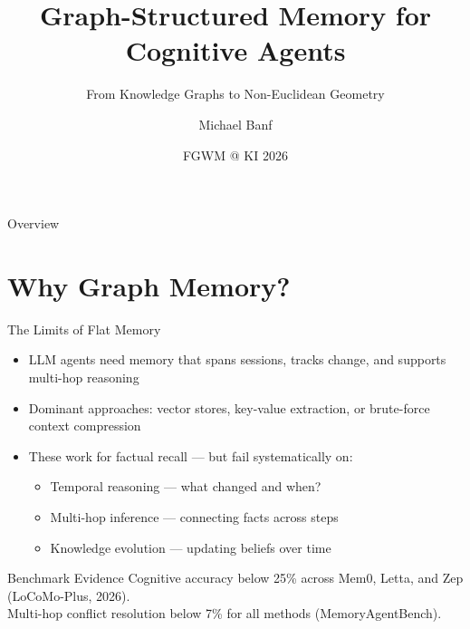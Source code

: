 \documentclass[aspectratio=169]{beamer}
\title{Graph-Structured Memory for Cognitive Agents}
\subtitle{From Knowledge Graphs to Non-Euclidean Geometry}
\author{Michael Banf}
\institute{Perelyn GmbH, Munich}
\date{FGWM @ KI 2026}
\begin{document}
\begin{frame}[plain]
  \titlepage
\end{frame}

\begin{frame}{Overview}
  \tableofcontents
\end{frame}

\section{Why Graph Memory?}

\begin{frame}[plain]
  \sectionpage
\end{frame}

\begin{frame}{The Limits of Flat Memory}
  \begin{itemize}
    \item LLM agents need memory that \alert{spans sessions}, tracks change,
      and supports multi-hop reasoning
    \item Dominant approaches: vector stores, key-value extraction, or
      brute-force context compression
    \item These work for factual recall --- but fail systematically on:
    \begin{itemize}
      \item \alert{Temporal reasoning} --- what changed and when?
      \item \alert{Multi-hop inference} --- connecting facts across steps
      \item \alert{Knowledge evolution} --- updating beliefs over time
    \end{itemize}
  \end{itemize}

  \vspace{0.3cm}

  \begin{block}{Benchmark Evidence}
    Cognitive accuracy below 25\% across Mem0, Letta, and Zep (LoCoMo-Plus, 2026).\\
    Multi-hop conflict resolution below 7\% for all methods (MemoryAgentBench).
  \end{block}
\end{frame}
\end{document}
